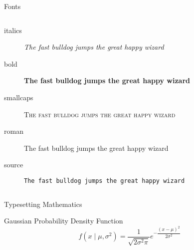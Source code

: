 \documentclass[aspectratio=169]{beamer}
\begin{document}
\begin{frame}[c]{Fonts}
  \begin{columns}
    \begin{column}{.7\textwidth}
      \begin{description}
      \item[italics] \textit{The fast bulldog jumps the great happy wizard}
      \item[bold] \textbf{The fast bulldog jumps the great happy wizard}
      \item[smallcaps] \textsc{The fast bulldog jumps the great happy wizard}
      \item[roman] {\rmfamily The fast bulldog jumps the great happy wizard}
      \item[source] \texttt{The fast bulldog jumps the great happy wizard}
      \end{description}
    \end{column}
    \vrule
    \begin{column}{.3\textwidth}
    \end{column}
  \end{columns}
\end{frame}

\begin{frame}[fragile]{Typesetting Mathematics}
  \begin{block}{Gaussian Probability Density Function}
    \[
      f \left(x \mid \mu, \sigma^2 \right) = \dfrac{1}{\sqrt{2 \sigma^2 \pi}} e^{- \dfrac{(x-\mu)^2}{2\sigma^2}}
    \]
  \end{block}

\end{frame}
\end{document}
